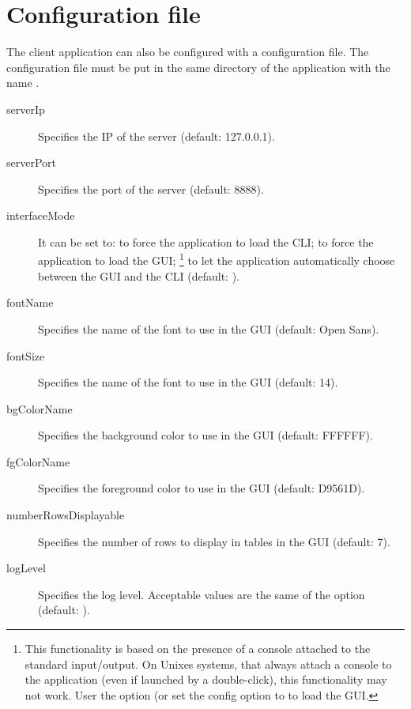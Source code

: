\section{Configuration file}

The client application can also be configured with a configuration file. The
configuration file must be put in the same directory of the application with the
name .



\begin{description}
	\item[serverIp] Specifies the IP of the server (default: 127.0.0.1).
	\item[serverPort] Specifies the port of the server (default: 8888).
	\item[interfaceMode] It can be set to:  to force the
		application to load the CLI;  to force the
		application to load the GUI; \footnote{This
		functionality is based on the presence of a console attached to
		the standard input/output. On Unixes systems, that always attach
		a console to the application (even if launched by a
		double-click), this functionality may not work. User the
		 option (or set the config option to
		 to load the GUI.} to let the application
		automatically choose between the GUI and the CLI (default: ).
	\item[fontName] Specifies the name of the font to use in the GUI
		(default: Open Sans).
	\item[fontSize] Specifies the name of the font to use in the GUI
		(default: 14).
	\item[bgColorName] Specifies the background color to use in the GUI
		(default: FFFFFF).
	\item[fgColorName] Specifies the foreground color to use in the GUI
		(default: D9561D).
	\item[numberRowsDisplayable] Specifies the number of rows to display in
		tables in the GUI (default: 7).
	\item[logLevel] Specifies the log level. Acceptable values are the same
		of the  option (default: ).
\end{description}
